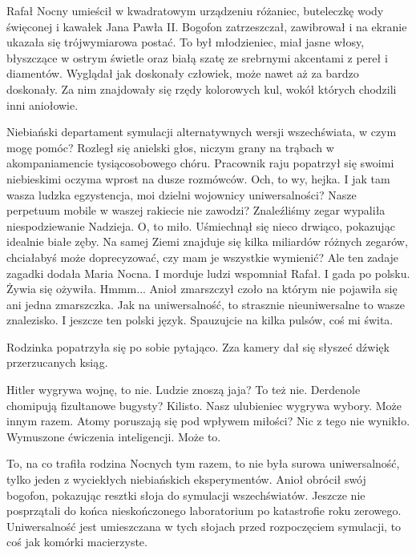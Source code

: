 Rafał Nocny umieścił w kwadratowym urządzeniu różaniec, buteleczkę wody święconej i kawałek Jana Pawła II.
Bogofon zatrzeszczał, zawibrował i na ekranie ukazała się trójwymiarowa postać.
To był młodzieniec, miał jasne włosy, błyszczące w ostrym świetle oraz białą szatę ze srebrnymi akcentami z pereł i diamentów.
Wyglądał jak doskonały człowiek, może nawet aż za bardzo doskonały.
Za nim znajdowały się rzędy kolorowych kul, wokół których chodzili inni aniołowie.
\begin{dialogue}
	\ds{} Niebiański departament symulacji alternatywnych wersji wszechświata, w czym mogę pomóc? 
		\dm{} Rozległ się anielski głos, niczym grany na trąbach w akompaniamencie tysiącosobowego chóru. Pracownik raju popatrzył się swoimi niebieskimi oczyma wprost na dusze rozmówców.
		\dm{} Och, to wy, hejka. I jak tam wasza ludzka egzystencja, moi dzielni wojownicy uniwersalności? Nasze perpetuum mobile w waszej rakiecie nie zawodzi?
	\ds{} Znaleźliśmy zegar 
		\dm{} wypaliła niespodziewanie Nadzieja.
	\ds{} O, to miło. 
		\dm{} Uśmiechnął się nieco drwiąco, pokazując idealnie białe zęby. 
		\dm{} Na samej Ziemi znajduje się kilka miliardów różnych zegarów, chciałabyś może doprecyzować, czy mam je wszystkie wymienić?
	\ds{} Ale ten zadaje zagadki 
		\dm{} dodała Maria Nocna.
	\ds{} I morduje ludzi 
		\dm{} wspomniał Rafał.
	\ds{} I gada po polsku. 
		\dm{} Żywia się ożywiła.
	\ds{} Hmmm... 
		\dm{} Anioł zmarszczył czoło na którym nie pojawiła się ani jedna zmarszczka.
		\dm{} Jak na uniwersalność, to strasznie nieuniwersalne to wasze znalezisko. I jeszcze ten polski język. Spauzujcie na kilka pulsów, coś mi świta.
\end{dialogue}
Rodzinka popatrzyła się po sobie pytająco. Zza kamery dał się słyszeć dźwięk przerzucanych ksiąg.
\begin{dialogue}
	\ds{} Hitler wygrywa wojnę, to nie.
	\ds{} Ludzie znoszą jaja? To też nie.
	\ds{} Derdenole chomipują fizultanowe bugysty? Kilisto.
	\ds{} Nasz ulubieniec wygrywa wybory. Może innym razem.
	\ds{} Atomy poruszają się pod wpływem miłości? Nic z tego nie wynikło.
	\ds{} Wymuszone ćwiczenia inteligencji. Może to.
\end{dialogue}
To, na co trafiła rodzina Nocnych tym razem, to nie była surowa uniwersalność, tylko jeden z wyciekłych niebiańskich eksperymentów.
Anioł obrócił swój bogofon, pokazując resztki słoja do symulacji wszechświatów.
Jeszcze nie posprzątali do końca nieskończonego laboratorium po katastrofie roku zerowego.
Uniwersalność jest umieszczana w tych słojach przed rozpoczęciem symulacji, to coś jak komórki macierzyste.
